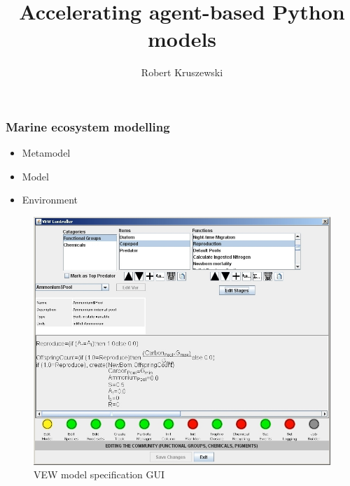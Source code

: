 \documentclass[t]{beamer}
\author{Robert Kruszewski}
\title[Accelerating agent-based Python models]{Accelerating agent-based Python models}
\begin{document}
\frame{\maketitle}


\begin{frame}
	\frametitle{\huge Marine ecosystem modelling}
		\LARGE
		\begin{itemize}
			\item Metamodel
			\item Model
			\item Environment
		\end{itemize}
\end{frame}


\begin{frame}[c]

\noindent\begin{minipage}{.45\textwidth}

\begin{figure}[H]
  \begin{center}
    \includegraphics[width=\textwidth,natwidth=808,natheight=676]{images/vew2007-10.jpg}
    \caption{VEW model specification GUI}
  \end{center}
\end{figure}

\end{minipage}\hfill
\begin{minipage}{.45\textwidth}


\end{minipage}
\end{frame}
\end{document}
